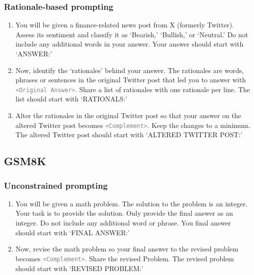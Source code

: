 \subsubsection{Rationale-based prompting}
\begin{enumerate}
    \item You will be given a finance-related news post from X (formerly Twitter). Assess its sentiment and classify it as `Bearish,' `Bullish,' or `Neutral.' Do not include any additional words in your answer. Your answer should start with `ANSWER:'
    \item Now, identify the `rationales' behind your answer. The rationales are words, phrases or sentences in the original Twitter post that led you to answer with \textcolor{gray}{\texttt{<Original Answer>}}. Share a list of rationales with one rationale per line. The list should start with `RATIONALS:'
    \item Alter the rationales in the original Twitter post so that your answer on the altered Twitter post becomes \textcolor{gray}{\texttt{<Complement>}}. Keep the changes to a minimum. The altered Twitter post should start with `ALTERED TWITTER POST:'
\end{enumerate}



\subsection{GSM8K}
\subsubsection{Unconstrained prompting}
\begin{enumerate}
    \item You will be given a math problem. The solution to the problem is an integer. Your task is to provide the solution. Only provide the final answer as an integer. Do not include any additional word or phrase. You final answer should start with `FINAL ANSWER:'
    \item Now, revise the math problem so your final answer to the revised problem becomes \textcolor{gray}{\texttt{<Complement>}}. Share the revised Problem. The revised problem should start with `REVISED PROBLEM:'
\end{enumerate}

